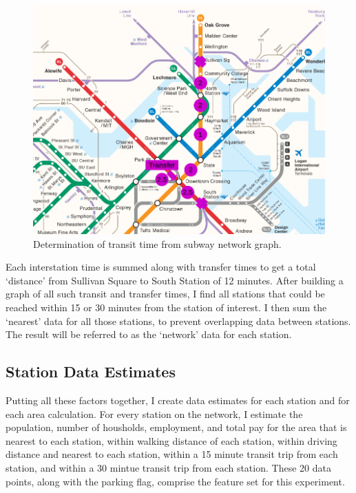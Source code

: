 \documentclass{article}
\begin{document}
\begin{figure}\label{fig:f4}
\begin{center}\includegraphics[scale=0.6]{transfer_with_markup}\end{center}
\caption{Determination of transit time from subway network graph.}
\end{figure}

Each interstation time is summed along with transfer times to get a total `distance' from Sullivan Square to South Station of 12 minutes. After building a graph of all such transit and transfer times, I find all stations that could be reached within 15 or 30 minutes from the station of interest. I then sum the `nearest' data for all those stations, to prevent overlapping data between stations. The result will be referred to as the `network' data for each station. 

\subsection{Station Data Estimates}

Putting all these factors together, I create data estimates for each station and for each area calculation. For every station on the network, I estimate the population, number of housholds, employment, and total pay for the area that is nearest to each station, within walking distance of each station, within  driving distance and nearest to each station, within a 15 minute transit trip from each station, and within a 30 mintue transit trip from each station. These 20 data points, along with the parking flag, comprise the feature set for this experiment.
\end{document}
